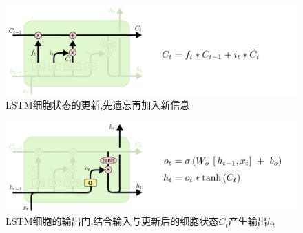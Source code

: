 \par
\begin{figure}[htbp!]
    \centering
    \includegraphics[width = 1.\textwidth]{chap/img/LSTM3-focus-C.png}
    \caption{
        LSTM细胞状态的更新,先遗忘再加入新信息\supercite{Understanding-LSTMs}
        }\label{fig:lstm_c}
\end{figure}
\par
\begin{figure}[htbp!]
    \centering
    \includegraphics[width = 1.\textwidth]{chap/img/LSTM3-focus-o.png}
    \caption{
        LSTM细胞的输出门,结合输入与更新后的细胞状态$C_t$产生输出$h_t$\supercite{Understanding-LSTMs}
        }\label{fig:lstm_o}
\end{figure}
\par

